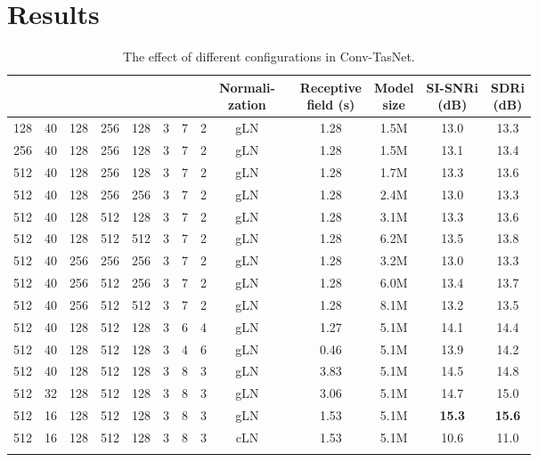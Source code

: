 \documentclass[journal]{IEEEtran}
\def\thline{\noalign{\hrule height 1.0pt}}
\begin{document}
\section{Results}
\label{sec:exp}
\begin{table*}[!htbp]
	\small
	\centering
	\caption{The effect of different configurations in Conv-TasNet.}
	\vspace{0.2cm}
	\label{tab:result-sep2}
	\begin{tabular}{c|c|c|c|c|c|c|c|c|c|c|c|c|c}
		\thline
		\thead{} & \thead{} & \thead{} & \thead{} & \thead{} & \thead{} & \thead{} & \thead{} & \thead{Normali-\\zation} & \thead{Causal} & \thead{Receptive \\ field (s)} & \thead{Model \\ size} & \thead{SI-SNRi\\ (dB)} & \thead{SDRi\\ (dB)} \\
		\hline
		128 & 40 & 128 & 256 & 128 & 3 & 7 & 2 & gLN & \texttimes & 1.28 & 1.5M & 13.0 & 13.3 \\
		256 & 40 & 128 & 256 & 128 & 3 & 7 & 2 & gLN & \texttimes & 1.28 & 1.5M & 13.1 & 13.4 \\
		512 & 40 & 128 & 256 & 128 & 3 & 7 & 2 & gLN & \texttimes & 1.28 & 1.7M & 13.3 & 13.6\\
		\hline
		512 & 40 & 128 & 256 & 256 & 3 & 7 & 2 & gLN & \texttimes & 1.28 & 2.4M & 13.0 & 13.3 \\ 
		512 & 40 & 128 & 512 & 128 & 3 & 7 & 2 & gLN & \texttimes & 1.28 & 3.1M & 13.3 & 13.6 \\
		512 & 40 & 128 & 512 & 512 & 3 & 7 & 2 & gLN & \texttimes & 1.28 & 6.2M & 13.5 & 13.8 \\
		512 & 40 & 256 & 256 & 256 & 3 & 7 & 2 & gLN & \texttimes & 1.28 & 3.2M & 13.0 & 13.3 \\
		512 & 40 & 256 & 512 & 256 & 3 & 7 & 2 & gLN & \texttimes & 1.28 & 6.0M & 13.4 & 13.7 \\
		512 & 40 & 256 & 512 & 512 & 3 & 7 & 2 & gLN & \texttimes & 1.28 & 8.1M & 13.2 & 13.5 \\
		\hline
		512 & 40 & 128 & 512 & 128 & 3 & 6 & 4 & gLN & \texttimes & 1.27 & 5.1M & 14.1 & 14.4 \\
		512 & 40 & 128 & 512 & 128 & 3 & 4 & 6 & gLN & \texttimes & 0.46 & 5.1M & 13.9 & 14.2 \\
		512 & 40 & 128 & 512 & 128 & 3 & 8 & 3 & gLN & \texttimes & 3.83 & 5.1M & 14.5 & 14.8 \\
		\hline
		512 & 32 & 128 & 512 & 128 & 3 & 8 & 3 & gLN & \texttimes & 3.06 & 5.1M & 14.7 & 15.0 \\
		512 & 16 & 128 & 512 & 128 & 3 & 8 & 3 & gLN & \texttimes & 1.53 & 5.1M & \bf{15.3} & \bf{15.6} \\
		512 & 16 & 128 & 512 & 128 & 3 & 8 & 3 & cLN & \checkmark & 1.53 & 5.1M & 10.6 & 11.0 \\
		\thline
	\end{tabular}
\end{table*}
\end{document}
